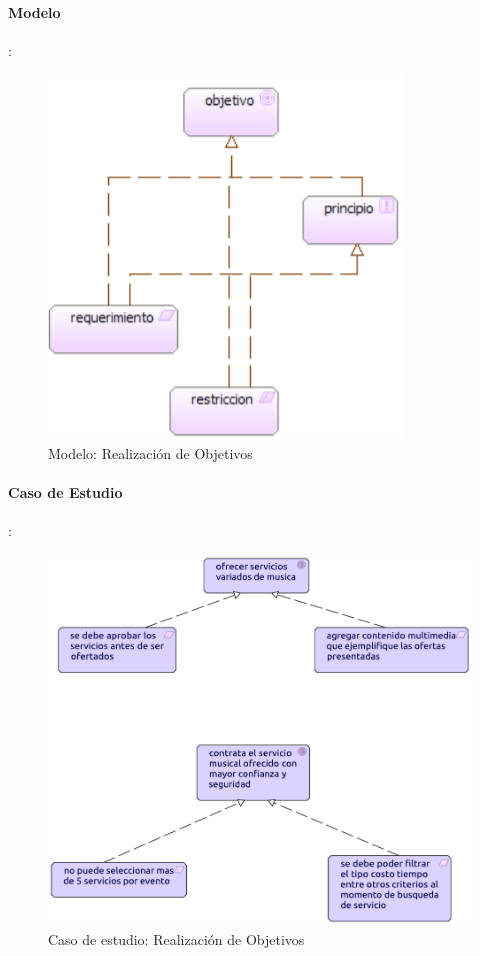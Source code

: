 \paragraph{Modelo}:
\begin{figure}[h!]
	\centering
	\includegraphics[width=0.6\linewidth]{Desarrollo/ArquitecturaEmpresarial/Motivacion/imgs/realizacionObjMetamodelo.PNG}
	\caption{Modelo: Realización de Objetivos}
\end{figure}
\paragraph{Caso de Estudio}:

\begin{figure}[h!]
	\centering
	\includegraphics[width=\linewidth]{Desarrollo/ArquitecturaEmpresarial/Motivacion/imgs/realizacionObj.pdf}
	\caption{Caso de estudio: Realización de Objetivos}
	\label{fig:comportamiento}
\end{figure}

